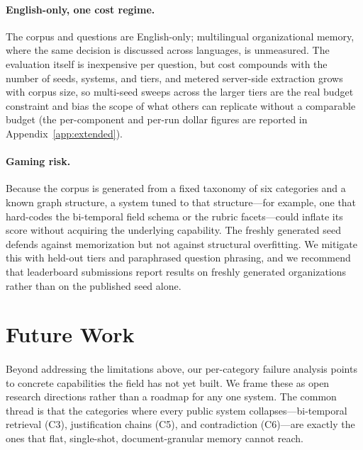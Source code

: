 \paragraph{English-only, one cost regime.}
\label{para:english-only-cost}
The corpus and questions are English-only; multilingual organizational memory,
where the same decision is discussed across languages, is unmeasured. The
evaluation itself is inexpensive per question, but cost compounds with the number
of seeds, systems, and tiers, and metered server-side extraction grows with
corpus size, so multi-seed sweeps across the larger tiers are the real budget
constraint and bias the scope of what others can replicate without a comparable
budget (the per-component and per-run dollar figures are reported in
Appendix~\ref{app:extended}).

\paragraph{Gaming risk.}
\label{para:gaming-risk}
Because the corpus is generated from a fixed taxonomy of six categories and a
known graph structure, a system tuned to that structure---for example, one that
hard-codes the bi-temporal field schema or the rubric facets---could inflate its
score without acquiring the underlying capability. The freshly generated seed
defends against memorization but not against structural overfitting. We mitigate
this with held-out tiers and paraphrased question phrasing, and we recommend that
leaderboard submissions report results on freshly generated organizations rather
than on the published seed alone.

\section{Future Work}
\label{sec:future}

\paragraph{}
\label{para:future-intro}
Beyond addressing the limitations above, our per-category failure analysis
points to concrete capabilities the field has not yet built. We frame these as
open research directions rather than a roadmap for any one system. The common
thread is that the categories where every public system collapses---bi-temporal
retrieval (C3), justification chains (C5), and contradiction (C6)---are exactly
the ones that flat, single-shot, document-granular memory cannot reach.


